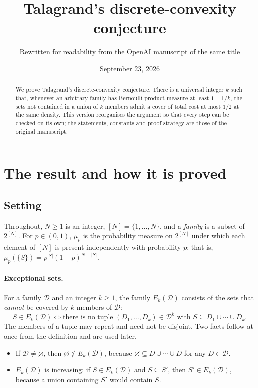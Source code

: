 \documentclass[11pt,letterpaper]{article}
\title{Talagrand's discrete-convexity conjecture}
\author{Rewritten for readability from the OpenAI manuscript of the same title}
\date{September 23, 2026}
\theoremstyle{definition}
\theoremstyle{remark}
\numberwithin{equation}{section}
\begin{document}
\maketitle
\begin{abstract}
We prove Talagrand's discrete-convexity conjecture.
There is a universal integer $k$ such that, whenever an arbitrary family has
Bernoulli product measure at least $1-1/k$, the sets not contained
in a union of $k$ members admit a cover of total cost at most $1/2$
at the same density. This version reorganises the argument so that every
step can be checked on its own; the statements, constants and proof
strategy are those of the original manuscript.
\end{abstract}

\section{The result and how it is proved}
\label{sec:introduction}

\subsection{Setting}

Throughout, $N\ge1$ is an integer, $[N]=\{1,\ldots,N\}$, and a
\emph{family} is a subset of $2^{[N]}$. For $p\in(0,1)$, $\mu_p$ is the
probability measure on $2^{[N]}$ under which each element of $[N]$ is
present independently with probability $p$; that is,
$\mu_p(\{S\})=p^{|S|}(1-p)^{N-|S|}$.

\paragraph{Exceptional sets.}
For a family $\mathcal D$ and an integer $k\ge1$, the family
$E_k(\mathcal D)$ consists of the sets that \emph{cannot} be covered by
$k$ members of $\mathcal D$:
\begin{equation}
\label{eq:exceptional-definition}
S\in E_k(\mathcal D)
\iff
\text{there is no tuple }(D_1,\ldots,D_k)\in\mathcal D^k
\text{ with }S\subseteq D_1\cup\cdots\cup D_k .
\end{equation}
The members of a tuple may repeat and need not be disjoint. Two facts
follow at once from the definition and are used later.
\begin{itemize}
\item If $\mathcal D\neq\varnothing$, then $\varnothing\notin E_k(\mathcal D)$,
because $\varnothing\subseteq D\cup\cdots\cup D$ for any $D\in\mathcal D$.
\item $E_k(\mathcal D)$ is increasing: if $S\in E_k(\mathcal D)$ and
$S\subseteq S'$, then $S'\in E_k(\mathcal D)$, because a union containing
$S'$ would contain $S$.
\end{itemize}
\end{document}
